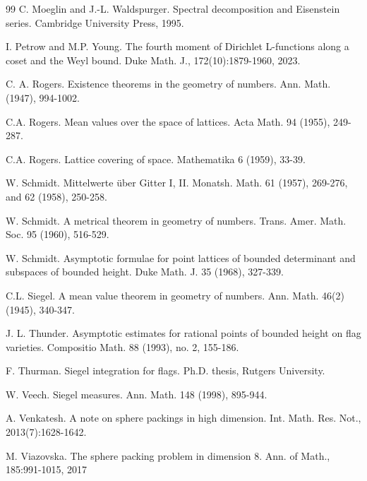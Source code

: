\documentclass[11pt]{amsart}
\numberwithin{theorem}{section}
\numberwithin{equation}{section}
\theoremstyle{remark}
\theoremstyle{definition}
\begin{document}
\begin{thebibliography}{99}
 C. Moeglin and J.-L. Waldspurger. Spectral decomposition and Eisenstein series. Cambridge University Press, 1995.

 I. Petrow and M.P. Young. The fourth moment of Dirichlet L-functions along a coset and the Weyl bound. Duke
Math. J., 172(10):1879-1960, 2023.

 C. A. Rogers. Existence theorems in the geometry of numbers. Ann. Math. (1947), 994-1002.

 C.A. Rogers. Mean values over the space of lattices. Acta Math. 94 (1955), 249-287.

 C.A. Rogers. Lattice covering of space. Mathematika 6 (1959), 33-39.

 W. Schmidt. Mittelwerte \"uber Gitter I, II. Monatsh. Math. 61 (1957), 269-276, and 62 (1958), 250-258.

 W. Schmidt. A metrical theorem in geometry of numbers. Trans. Amer. Math. Soc. 95 (1960), 516-529.

 W. Schmidt. Asymptotic formulae for point lattices of bounded determinant and subspaces of
bounded height. Duke Math. J. 35 (1968), 327-339.

 C.L. Siegel. A mean value theorem in geometry of numbers. Ann. Math. 46(2) (1945), 340-347.

 J. L. Thunder. Asymptotic estimates for rational points of bounded height on flag varieties. Compositio Math. 88 (1993), no. 2, 155-186.

 F. Thurman. Siegel integration for flags. Ph.D. thesis, Rutgers University.

 W. Veech. Siegel measures. Ann. Math. 148 (1998), 895-944.

 A. Venkatesh. A note on sphere packings in high dimension. Int. Math. Res. Not., 2013(7):1628-1642.

 M. Viazovska. The sphere packing problem in dimension 8. Ann. of Math., 185:991-1015, 2017



\end{thebibliography}
\end{document}
